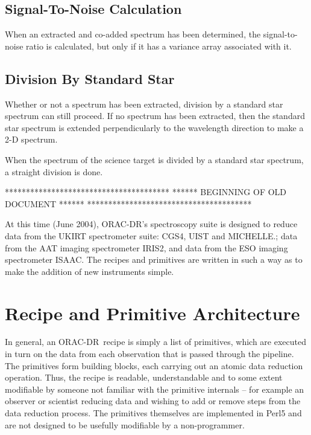 \documentclass[twoside,11pt]{article}
\newcommand{\xlabel}[1]{}
\renewcommand{\_}{\texttt{\symbol{95}}}
\newcommand{\ORACDR}{{\footnotesize ORAC-DR}}
\begin{document}
\subsection{\xlabel{snr_calculation}Signal-To-Noise Calculation\label{snr_calculation}}

When an extracted and co-added spectrum has been determined, the
signal-to-noise ratio is calculated, but only if it has a variance
array associated with it.
\newline {\em[\_CALCULATE\_SNR\_]}

\subsection{\xlabel{division_by_standard}Division By Standard Star\label{division_by_standard}}

Whether or not a spectrum has been extracted, division by a standard star
spectrum can still proceed. If no spectrum has been extracted, then the
standard star spectrum is extended perpendicularly to the wavelength direction
to make a 2-D spectrum.

When the spectrum of the science target is divided by a standard star spectrum, a straight division is done. 




***************************************
****** BEGINNING OF OLD DOCUMENT ******
***************************************

At this time (June 2004), \ORACDR's spectroscopy suite is designed
to reduce data from the UKIRT spectrometer suite: CGS4, UIST and
MICHELLE.; data from the AAT imaging spectrometer IRIS2, and data
from the ESO imaging spectrometer ISAAC. The recipes and primitives
are written in such a way as to make the addition of new instruments
simple.

\section{Recipe and Primitive Architecture}

In general, an \ORACDR\ recipe is simply a list of primitives, which
are executed in turn on the data from each observation that is passed
through the pipeline. The primitives form building blocks, each
carrying out an atomic data reduction operation. Thus, the recipe is
readable, understandable and to some extent modifiable by someone not
familiar with the primitive internals -- for example an observer or
scientist reducing data and wishing to add or remove steps from the
data reduction process. The primitives themselves are implemented in
Perl5 and are not designed to be usefully modifiable by a
non-programmer.
\end{document}
